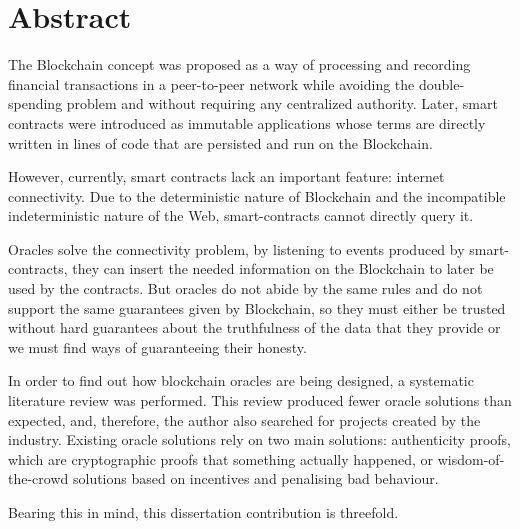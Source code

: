 \chapter*{Abstract}

The Blockchain concept was proposed as a way of processing and recording financial transactions in a peer-to-peer network while avoiding the double-spending problem and without requiring any centralized authority. Later, smart contracts were introduced as immutable applications whose terms are directly written in lines of code that are persisted and run on the Blockchain.

However, currently, smart contracts lack an important feature: internet connectivity. Due to the deterministic nature of Blockchain and the incompatible indeterministic nature of the Web, smart-contracts cannot directly query it.

Oracles solve the connectivity problem, by listening to events produced by smart-contracts, they can insert the needed information on the Blockchain to later be used by the contracts. But oracles do not abide by the same rules and do not support the same guarantees given by Blockchain, so they must either be trusted without hard guarantees about the truthfulness of the data that they provide or we must find ways of guaranteeing their honesty.

In order to find out how blockchain oracles are being designed, a systematic literature review was performed. This review produced fewer oracle solutions than expected, and, therefore, the author also searched for projects created by the industry. Existing oracle solutions rely on two main solutions: authenticity proofs, which are cryptographic proofs that something actually happened, or wisdom-of-the-crowd solutions based on incentives and penalising bad behaviour.



Bearing this in mind, this dissertation contribution is threefold.

